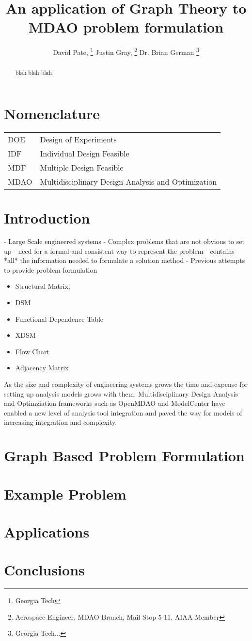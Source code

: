 \documentclass[]{aiaa-tc} %
\title{An application of Graph Theory to MDAO problem formulation}
\author{
  David Pate, %
     \thanks{Georgia Tech}
  Justin Gray,%
     \thanks{Aerospace Engineer, MDAO Branch, Mail Stop 5-11, AIAA Member}
  Dr. Brian German 
     \thanks{Georgia Tech...}
 }
\begin{document}
\maketitle
 
\begin{abstract}
   blah blah blah
\end{abstract}

\section*{Nomenclature}

\begin{tabular}{l l} 
    DOE      & Design of Experiments \\ 
    IDF      & Individual Design Feasible  \\
    MDF      & Multiple Design Feasible \\
    MDAO     & Multidisciplinary Design Analysis and Optimization \\
\end{tabular}


\section{Introduction}
    
    - Large Scale engineered systems 
    - Complex problems that are not obvious to set up
    - need for a formal and consistent way to represent the problem
      - contains *all* the information needed to formulate a solution method
    - Previous attempts to provide problem formulation
 
      \begin{itemize}
        \item Structural Matrix, 
        \item DSM
        \item Functional Dependence Table
        \item XDSM
        \item Flow Chart
        \item Adjacency Matrix
      \end{itemize}

   As the size and complexity of engineering systems grows the time and expense for setting up 
   analysis models grows with them. Multidisciplinary Design Analysis and Optimziation
   frameworks such as OpenMDAO and ModelCenter have enabled a new level of analysis tool integration 
   and paved the way for models of increasing integration and complexity. 

\section{Graph Based Problem Formulation}

\section{Example Problem}

\section{Applications}

\section{Conclusions}
\end{document}
